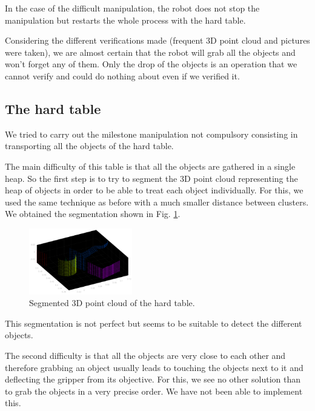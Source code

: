 \documentclass[a4paper, 10pt, conference]{ieeeconf}
\begin{document}
    In the case of the difficult manipulation, the robot does not stop the manipulation but restarts the whole process with the hard table.
    
    Considering the different verifications made (frequent 3D point cloud and pictures were taken), we are almost certain that the robot will grab all the objects and won't forget any of them. Only the drop of the objects is an operation that we cannot verify and could do nothing about even if we verified it.
    
    \subsection{The hard table}
    
    We tried to carry out the milestone manipulation not compulsory consisting in transporting all the objects of the hard table.
    
    The main difficulty of this table is that all the objects are gathered in a single heap. So the first step is to try to segment the 3D point cloud representing the heap of objects in order to be able to treat each object individually. For this, we used the same technique as before with a much smaller distance between clusters. We obtained the segmentation shown in Fig. \ref{fig:manipulation.hard.table}.
    
    \begin{figure}[!h]
        \centering
        \includegraphics[width=0.4\textwidth]{resources/png/clusters-hard-segmented.png}
        \caption{Segmented 3D point cloud of the hard table.}
        \label{fig:manipulation.hard.table}
    \end{figure}
    
    This segmentation is not perfect but seems to be suitable to detect the different objects.
    
    The second difficulty is that all the objects are very close to each other and therefore grabbing an object usually leads to touching the objects next to it and deflecting the gripper from its objective. For this, we see no other solution than to grab the objects in a very precise order. We have not been able to implement this.
    
\end{document}
